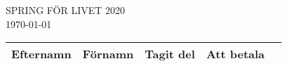 \documentclass{article}
\begin{document}
\begin{center}
    \Huge\textsc{SPRING FÖR LIVET 2020} \normalsize \\
    \vspace{5ex}
    \Huge\today \normalsize \\
    \vspace{6ex}
        
        \Huge
        \begin{tabular}{|c|c|c|c|c|}
            \hline 
            \textbf{Efternamn} & \textbf{Förnamn} & \textbf{Tagit del} & \textbf{Att betala} \\
            \hline 
            \hline
            \hline
        \end{tabular}
    \end{center}
\end{document}
